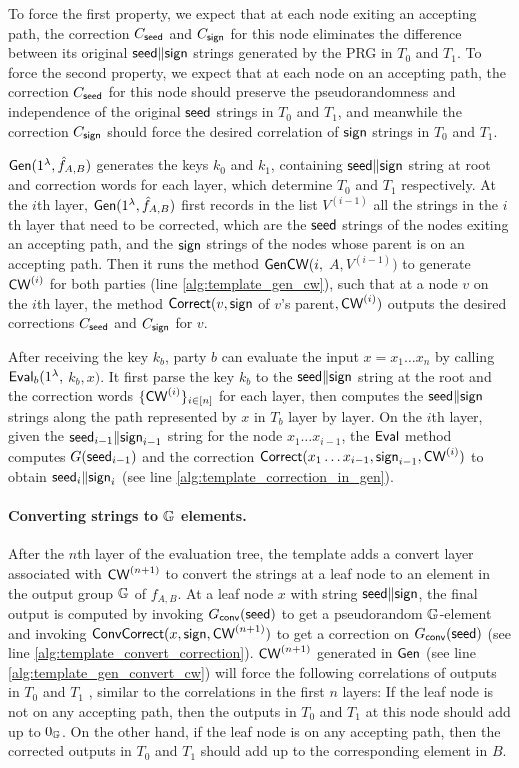 To force the first property, we expect that at each node exiting an accepting path, the correction $C_{\sf seed}$ and $C_{\sf sign}$ for this node eliminates the difference between its original ${\sf seed}\|{\sf sign}$ strings generated by the PRG in $T_0$ and $T_1$. 
To force the second property, we expect that at each node on an accepting path, the correction $C_{\sf seed}$ for this node should preserve the pseudorandomness and independence of the original ${\sf seed}$ strings in $T_0$ and $T_1$, and meanwhile the correction $C_{\sf sign}$ should force the desired correlation of ${\sf sign}$ strings in $T_0$ and $T_1$. 

${\sf Gen}(1^\lambda, \hat{f}_{A,B})$ generates the keys $k_0$ and $k_1$, containing ${\sf seed}\|{\sf sign}$ string at root and correction words for each layer, which determine $T_0$ and $T_1$ respectively. 
At the $i$th layer, ${\sf Gen}(1^\lambda, \hat{f}_{A,B})$ first records in the list $V^{(i-1)}$ all the strings in the $i$th layer that need to be corrected, which are the ${\sf seed}$ strings of the nodes exiting an accepting path, and the ${\sf sign}$ strings of the nodes whose parent is on an accepting path. Then it runs the method ${\sf GenCW}(i,$ $A, V^{(i-1)})$ to generate ${\sf CW}^{(i)}$ for both parties (line \ref{alg:template_gen_cw}), such that at a node $v$ on the $i$th layer, the method ${\sf Correct}(v,{\sf sign}$ of $v$'s parent$,{\sf CW}^{(i)})$ outputs the desired corrections $C_{\sf seed}$ and $C_{\sf sign}$ for $v$. 

After receiving the key $k_b$, party $b$ can evaluate the input $x=x_1\dots x_n$ by calling ${\sf Eval}_b(1^\lambda,$ $k_b,x)$. It first parse the key $k_b$ to the ${\sf seed}\|{\sf sign}$ string at the root and the correction words $\{{\sf CW}^{(i)}\}_{i\in[n]}$ for each layer, then computes the ${\sf seed}\|{\sf sign}$ strings along the path represented by $x$ in $T_b$ layer by layer. On the $i$th layer, given the ${\sf seed}_{i-1}\|{\sf sign}_{i-1}$ string for the node  $x_1\dots x_{i-1}$, the ${\sf Eval}$ method computes $G({\sf seed}_{i-1})$ and the correction ${\sf Correct}(x_1\dots x_{i-1},{\sf sign}_{i-1},{\sf CW}^{(i)})$ to obtain ${\sf seed}_i\|{\sf sign}_i$ (see line \ref{alg:template_correction_in_gen}).  
\paragraph{Converting strings to $\mathbb{G}$ elements. }After the $n$th layer of the evaluation tree, the template adds a convert layer associated with ${\sf CW}^{(n+1)}$ to convert the strings at a leaf node to an element in the output group $\mathbb{G}$ of $f_{A,B}$. At a leaf node $x$ with string ${\sf seed}\|{\sf sign}$, the final output is computed by invoking $G_{\sf conv}({\sf seed})$ to get a pseudorandom $\mathbb{G}$-element and invoking  ${\sf ConvCorrect}(x, {\sf sign}, {\sf CW}^{(n+1)})$ to get a correction on $G_{\sf conv}({\sf seed})$ (see line \ref{alg:template_convert_correction}). ${\sf CW}^{(n+1)}$ generated in ${\sf Gen}$ (see line \ref{alg:template_gen_convert_cw}) will force the following correlations of outputs in $T_0$ and $T_1$ , similar to the correlations in the first $n$ layers: 
If the leaf node is not on any accepting path, then the outputs in $T_0$ and $T_1$ at this node should add up to $0_{\mathbb{G}}$. On the other hand, if the leaf node is on any accepting path, then the corrected outputs in $T_0$ and $T_1$ should add up to the corresponding element in $B$.

